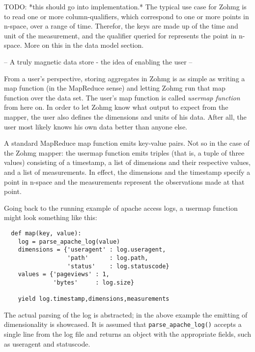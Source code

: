 

TODO: *this should go into implementation.*
The typical use case for Zohmg is to read one or more column-qualifiers,
which correspond to one or more points in n-space, over a range of time.
Therefor, the keys are made up of the time and unit of the measurement,
and the qualifier queried for represents the point in n-space. More on
this in the data model section.


-- A truly magnetic data store - the idea of enabling the user --

From a user's perspective, storing aggregates in Zohmg is as simple as writing
a map function (in the MapReduce sense) and letting Zohmg run that map function
over the data set. The user's map function is called \textit{usermap function}
from here on. In order to let Zohmg know what output to expect from the mapper,
the user also defines the dimensions and units of his data. After all, the user
most likely knows his own data better than anyone else.

A standard MapReduce map function emits key-value pairs. Not so in the case of
the Zohmg mapper: the usermap function emits triples (that is, a tuple of three
values) consisting of a timestamp, a list of dimensions and their respective
values, and a list of measurements. In effect, the dimensions and the timestamp
specify a point in n-space and the measurements represent the observations made
at that point.

Going back to the running example of apache access logs, a usermap function
might look something like this:

\begin{verbatim}
  def map(key, value):
    log = parse_apache_log(value)
    dimensions = {'useragent' : log.useragent,
                  'path'      : log.path,
                  'status'    : log.statuscode}
    values = {'pageviews' : 1,
              'bytes'     : log.size}

    yield log.timestamp,dimensions,measurements
\end{verbatim}

\vspace{12pt}

The actual parsing of the log is abstracted; in the above example the
emitting of dimensionality is showcased. It is assumed that
\texttt{parse\_apache\_log()} accepts a single line from the log file and
returns an object with the appropriate fields, such as useragent and
statuscode.

